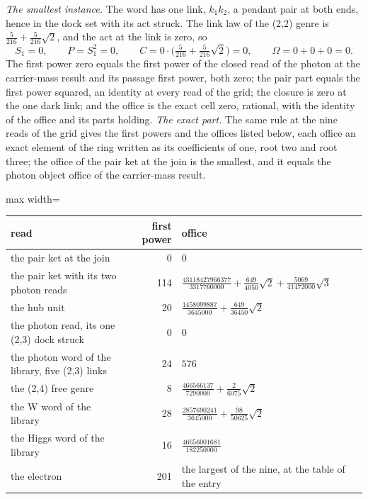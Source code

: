 \begin{chproof}
\textit{The smallest instance.} The word has one link, $k_1k_2$, a pendant pair at both ends, hence in the dock set with its act struck. The link law of the (2,2) genre is $\tfrac{5}{216} + \tfrac{5}{216}\sqrt{2}$, and the act at the link is zero, so
\begin{equation} S_1 = 0, \qquad P = S_1^{2} = 0, \qquad C = 0\cdot\Big(\tfrac{5}{216} + \tfrac{5}{216}\sqrt{2}\Big) = 0, \qquad \Omega = 0 + 0 + 0 = 0 . \end{equation}
The first power zero equals the first power of the closed read of the photon at the carrier-mass result and its passage first power, both zero; the pair part equals the first power squared, an identity at every read of the grid; the closure is zero at the one dark link; and the office is the exact cell zero, rational, with the identity of the office and its parts holding.
\textit{The exact part.} The same rule at the nine reads of the grid gives the first powers and the offices listed below, each office an exact element of the ring written as its coefficients of one, root two and root three; the office of the pair ket at the join is the smallest, and it equals the photon object office of the carrier-mass result.
\begin{center}\begin{adjustbox}{max width=\linewidth}\begin{tabular}{lrl}\hline read & first power & office \\ \hline the pair ket at the join & 0 & $0$ \\ the pair ket with its two photon reads & 114 & $\tfrac{43118427966377}{3317760000} + \tfrac{649}{4050}\sqrt{2} + \tfrac{5069}{41472000}\sqrt{3}$ \\ the hub unit & 20 & $\tfrac{1458099887}{3645000} + \tfrac{649}{36450}\sqrt{2}$ \\ the photon read, its one (2,3) dock struck & 0 & $0$ \\ the photon word of the library, five (2,3) links & 24 & $576$ \\ the (2,4) free genre & 8 & $\tfrac{466566137}{7290000} + \tfrac{2}{6075}\sqrt{2}$ \\ the W word of the library & 28 & $\tfrac{2857690241}{3645000} + \tfrac{98}{50625}\sqrt{2}$ \\ the Higgs word of the library & 16 & $\tfrac{46656001681}{182250000}$ \\ the electron & 201 & the largest of the nine, at the table of the entry \\ \hline \end{tabular}\end{adjustbox}\end{center}

\end{chproof}
